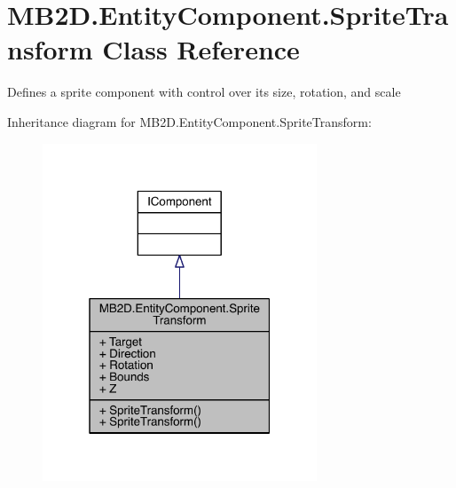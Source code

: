 \hypertarget{class_m_b2_d_1_1_entity_component_1_1_sprite_transform}{}\section{M\+B2\+D.\+Entity\+Component.\+Sprite\+Transform Class Reference}
\label{class_m_b2_d_1_1_entity_component_1_1_sprite_transform}


Defines a sprite component with control over its size, rotation, and scale  




Inheritance diagram for M\+B2\+D.\+Entity\+Component.\+Sprite\+Transform\+:
\nopagebreak
\begin{figure}[H]
\begin{center}
\leavevmode
\includegraphics[width=232pt]{class_m_b2_d_1_1_entity_component_1_1_sprite_transform__inherit__graph}
\end{center}
\end{figure}


